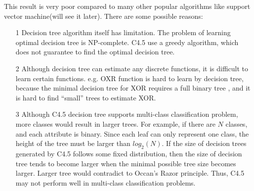 \documentclass[a4paper,11pt]{article}
\begin{document}
This result is very poor compared to many other popular algorithms like support vector machine(will see it later). There are some possible reasons:\\
\begin{enumerate}
\item[1] Decision tree algorithm itself has limitation. The problem of learning optimal decision tree is NP-complete\cite{dtnpc}. C4.5 use a greedy algorithm, which does not guarantee to find the optimal decision tree.
\item[2] Although decision tree can estimate any discrete functions, it is difficult to learn certain functions. e.g. OXR function is hard to learn by decision tree, because the minimal decision tree for XOR requires a full binary tree , and it is hard to find ``small'' trees to estimate XOR.
\item[3] Although C4.5 decision tree supports multi-class classification problem, more classes would result in larger trees. For example, if there are $N$ classes, and each attribute is binary. Since each leaf can only represent one class, the height of the tree must be larger than $log_2(N)$. If the size of decision trees generated by C4.5 follows some fixed distribution, then the size of decision tree tends to become larger when the minimal possible tree size becomes larger. Larger tree would contradict to Occan's Razor principle. Thus, C4.5 may not perform well in multi-class classification problems.
\end{enumerate}
\end{document}

